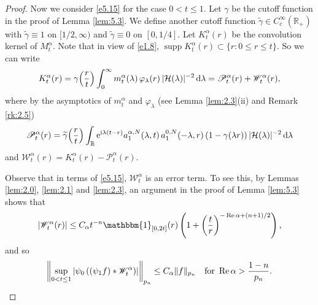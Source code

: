 \documentclass[11pt]{amsproc}
\newcommand{\R}{\mathbb{R}}
\newcommand{\e}{\mathrm{e}}
\newcommand{\indicator}{\mathbbm{1}}
\newcommand{\supp}{\mathop{\mathrm{supp}}}
\newcommand{\0}{\mathbf{0}}
\newcommand{\bc}{{ \mathcal{H} }}
\renewcommand{\Re}{\mathop{\mathrm{Re}}}
\renewcommand{\i}{\mathrm{i}}
\renewcommand{\d}{\mathrm{d}}
\numberwithin{equation}{section}
\numberwithin{figure}{section}
\theoremstyle{definition}
\theoremstyle{remark}
\numberwithin{thm}{section}
\begin{document}
\begin{proof}
Now we consider \eqref{e5.15} for the case $0<t\leq 1$.   Let $\gamma$ be the cutoff function in the proof of Lemma \ref{lem:5.3}. We define another cutoff function $\widetilde{\gamma}\in C_c^\infty(\R_+)$ with $\widetilde{\gamma}\equiv 1$ on $[1/2,\infty)$ and $\widetilde{\gamma}\equiv 0$ on $[0,1/4]$. Let $K^\alpha_t(r)$ be the convolution kernel of $M^\alpha_t$. Note that in view of \eqref{e1.8}, $\supp K^\alpha_t(r)\subset \{r:0\leq r\leq t\}$. So we can write
\begin{eqnarray*}
K^\alpha_t(r)=\gamma\!\left({r\over t}\right)\int_0^\infty m^\alpha_t(\lambda)\,\varphi_\lambda(r)\,|\bc(\lambda)|^{-2}\,\d \lambda=\mathscr{P}^\alpha_t(r)+\mathscr{W}^\alpha_t(r),
\end{eqnarray*}
where by the asymptotics of $m^\alpha_t$ and $\varphi_\lambda$ (see Lemma \ref{lem:2.3}(ii) and Remark \ref{rk:2.5})
\begin{eqnarray*}
\mathscr{P}^\alpha_t(r)=\widetilde{\gamma}\!\left({r\over t}\right)\int_\R\e^{\i\lambda(t-r)}a^{\alpha,N}_1(\lambda,t)\,a^{0,N}_1(-\lambda,r)\,(1-\gamma(\lambda r))\,|\bc(\lambda)|^{-2}\,\d\lambda
\end{eqnarray*}
and $\mathscr{W}^\alpha_t(r)=K^\alpha_t(r)-\mathscr{P}^\alpha_t(r)$.

Observe that in terms of \eqref{e5.15}, $\mathscr{W}^\alpha_t$ is an error term. To see this, by Lemmas \ref{lem:2.0}, \ref{lem:2.1} and \ref{lem:2.3}, an argument in  the proof of Lemma \ref{lem:5.3} shows that
\begin{eqnarray*}
|\mathscr{W}^\alpha_t(r)|\leq C_\alpha t^{-n}\indicator_{[0,2t]}(r)\left(1+\left({t\over r}\right)^{-\Re\alpha+(n+1)/2}\right),
\end{eqnarray*}
and so
\begin{eqnarray}\label{e5.166}
\left\|\sup_{0<t\leq 1}|\psi_0\,((\psi_1f)*\mathscr{W}^\alpha_t)|\right\|_{p_n}\leq C_\alpha \|f\|_{p_n}\ \ \ \mbox{for }\Re\alpha>{1-n\over p_n}.
\end{eqnarray}


\end{proof}
\end{document}
